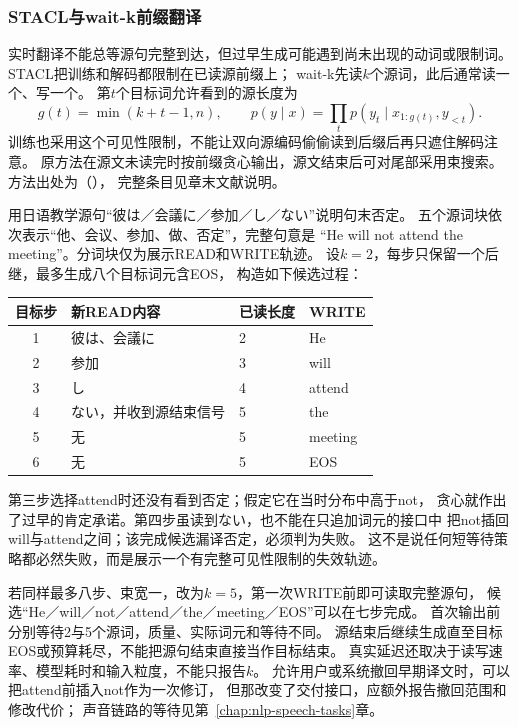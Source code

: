 \subsubsection{STACL与wait-k前缀翻译}
\label{sec:nlp-generation-wait-k}

实时翻译不能总等源句完整到达，但过早生成可能遇到尚未出现的动词或限制词。
STACL把训练和解码都限制在已读源前缀上；
wait-k先读$k$个源词，此后通常读一个、写一个。
第$t$个目标词允许看到的源长度为
\begin{equation}
  g(t)=\min(k+t-1,n),\qquad
  p(y\mid x)=\prod_t p(y_t\mid x_{1:g(t)},y_{<t}).
  \label{eq:nlp-generation-wait-k}
\end{equation}
训练也采用这个可见性限制，不能让双向源编码偷偷读到后缀后再只遮住解码注意。
原方法在源文未读完时按前缀贪心输出，源文结束后可对尾部采用束搜索。
方法出处为（\citeyear{nlp-intro-ma2019stacl}），
完整条目见章末文献说明。

用日语教学源句“彼は／会議に／参加／し／ない”说明句末否定。
五个源词块依次表示“他、会议、参加、做、否定”，完整句意是
“He will not attend the meeting”。分词块仅为展示READ和WRITE轨迹。
设$k=2$，每步只保留一个后继，最多生成八个目标词元含EOS，
构造如下候选过程：
\begin{center}
  \begin{tabular}{@{}clll@{}}
    \toprule
    目标步 & 新READ内容 & 已读长度 & WRITE\\
    \midrule
    1 & 彼は、会議に & 2 & He\\
    2 & 参加 & 3 & will\\
    3 & し & 4 & attend\\
    4 & ない，并收到源结束信号 & 5 & the\\
    5 & 无 & 5 & meeting\\
    6 & 无 & 5 & EOS\\
    \bottomrule
  \end{tabular}
\end{center}
第三步选择attend时还没有看到否定；假定它在当时分布中高于not，
贪心就作出了过早的肯定承诺。第四步虽读到ない，也不能在只追加词元的接口中
把not插回will与attend之间；该完成候选漏译否定，必须判为失败。
这不是说任何短等待策略都必然失败，而是展示一个有完整可见性限制的失效轨迹。

若同样最多八步、束宽一，改为$k=5$，第一次WRITE前即可读取完整源句，
候选“He／will／not／attend／the／meeting／EOS”可以在七步完成。
首次输出前分别等待2与5个源词，质量、实际词元和等待不同。
源结束后继续生成直至目标EOS或预算耗尽，不能把源句结束直接当作目标结束。
真实延迟还取决于读写速率、模型耗时和输入粒度，不能只报告$k$。
允许用户或系统撤回早期译文时，可以把attend前插入not作为一次修订，
但那改变了交付接口，应额外报告撤回范围和修改代价；
声音链路的等待见第~\ref{chap:nlp-speech-tasks}章。

